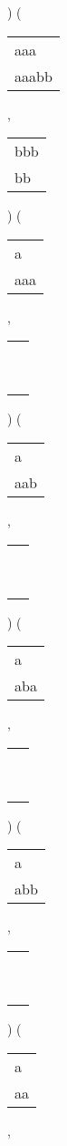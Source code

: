 \begin{description}
\begin{tabular}{|l|}
\end{tabular} 
) 
 ( 
\begin{tabular}{|l|} \hline
aaa\ \  \\
aaabb \\
\hline
\end{tabular} 
 , 
\begin{tabular}{|l|} \hline
bbb \\
bb\  \\
\hline
\end{tabular} 
) 
 ( 
\begin{tabular}{|l|} \hline
a\ \  \\
aaa \\
\hline
\end{tabular} 
 , 
\begin{tabular}{|l|} \hline
\ \\ \ \\ \hline
\end{tabular} 
) 
 ( 
\begin{tabular}{|l|} \hline
a\ \  \\
aab \\
\hline
\end{tabular} 
 , 
\begin{tabular}{|l|} \hline
\ \\ \ \\ \hline
\end{tabular} 
) 
 ( 
\begin{tabular}{|l|} \hline
a\ \  \\
aba \\
\hline
\end{tabular} 
 , 
\begin{tabular}{|l|} \hline
\ \\ \ \\ \hline
\end{tabular} 
) 
 ( 
\begin{tabular}{|l|} \hline
a\ \  \\
abb \\
\hline
\end{tabular} 
 , 
\begin{tabular}{|l|} \hline
\ \\ \ \\ \hline
\end{tabular} 
) 
 ( 
\begin{tabular}{|l|} \hline
a\  \\
aa \\
\hline
\end{tabular} 
 , 
\begin{tabular}{|l|} \hline

\end{tabular}
\end{description}

